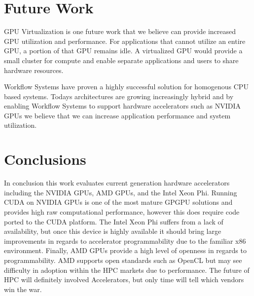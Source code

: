 \documentclass[conference]{IEEEtran}
\begin{document}
\section{Future Work}
GPU Virtualization is one future work that we believe can provide increased GPU utilization and performance. For applications that cannot utilize an entire GPU, a portion of that GPU remains idle. A virtualized GPU would provide a small cluster for compute and enable separate applications and users to share hardware resources.

Workflow Systems have proven a highly successful solution for homogenous CPU based systems. Todays architectures are growing increasingly hybrid and by enabling Workflow Systems to support hardware accelerators such as NVIDIA GPUs we believe that we can increase application performance and system utilization.

\section{Conclusions}
In conclusion this work evaluates current generation hardware accelerators including the NVIDIA GPUs, AMD GPUs, and the Intel Xeon Phi. Running CUDA on NVIDIA GPUs is one of the most mature GPGPU solutions and provides high raw computational performance, however this does require code ported to the CUDA platform. The Intel Xeon Phi suffers from a lack of availability, but once this device is highly available it should bring large improvements in regards to accelerator programmability due to the familiar x86 environment. Finally, AMD GPUs provide a high level of openness in regards to programmability. AMD supports open standards such as OpenCL but may see difficulty in adoption within the HPC markets due to performance. The future of HPC will definitely involved Accelerators, but only time will tell which vendors win the war.



\end{document}
